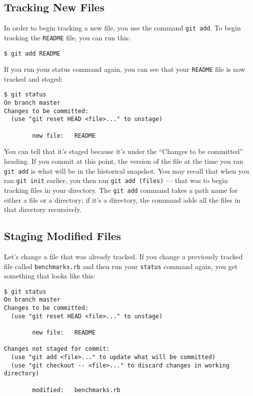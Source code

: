 \documentclass[a4paper]{book}
\begin{document}
\subsection{Tracking New Files}\label{tracking-new-files}

In order to begin tracking a new file, you use the command \texttt{git add}. To begin tracking the \texttt{README} file, you can run this:

\begin{shaded}\begin{verbatim}
$ git add README
\end{verbatim}\end{shaded}

If you run your status command again, you can see that your \texttt{README} file is now tracked and staged:

\begin{shaded}\begin{verbatim}
$ git status
On branch master
Changes to be committed:
  (use "git reset HEAD <file>..." to unstage)

        new file:   README
\end{verbatim}\end{shaded}

You can tell that it's staged because it's under the “Changes to be committed” heading. If you commit at this point, the version of the file at the time you ran \texttt{git add} is what will be in the historical snapshot. You may recall that when you ran \texttt{git init} earlier, you then ran \texttt{git add (files)} --- that was to begin tracking files in your directory. The \texttt{git add} command takes a path name for either a file or a directory; if it's a directory, the command adds all the files in that directory recursively.

\subsection{Staging Modified Files}\label{staging-modified-files}

Let's change a file that was already tracked. If you change a previously tracked file called \texttt{benchmarks.rb} and then run your \texttt{status} command again, you get something that looks like this:

\begin{shaded}\begin{verbatim}
$ git status
On branch master
Changes to be committed:
  (use "git reset HEAD <file>..." to unstage)

        new file:   README

Changes not staged for commit:
  (use "git add <file>..." to update what will be committed)
  (use "git checkout -- <file>..." to discard changes in working directory)

        modified:   benchmarks.rb
\end{verbatim}\end{shaded}
\end{document}
